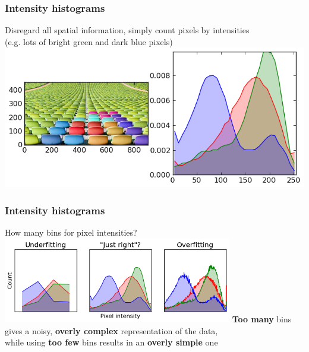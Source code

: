 
\begin{frame}
  \frametitle{Intensity histograms}

  \begin{center}
    Disregard all spatial information, simply count pixels by intensities \\
    (e.g. lots of bright green and dark blue pixels)
    \vskip20pt
    \includegraphics[width=\textwidth]{../../code/image_data/chairs_32.png}
  \end{center}

\end{frame}


\begin{frame}
  \frametitle{Intensity histograms}

  \begin{center}
    How many bins for pixel intensities?
    \vskip20pt
    \includegraphics[width=0.75\textwidth]{chairs_hists.png}
    \vskip20pt
    \textbf{Too many} bins gives a noisy, \textbf{overly complex} representation of the data,\\
    while using \textbf{too few} bins results in an \textbf{overly simple} one
  \end{center}

\end{frame}

